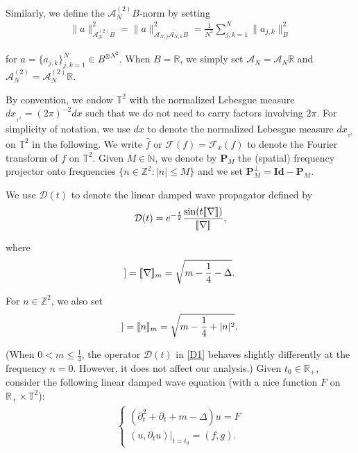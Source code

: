 \documentclass[letterpaper, 11pt,  reqno]{amsart}
\newcommand{\1}{\hspace{0.5mm}\text{I}\hspace{0.2mm}}
\newcommand{\noi}{\noindent}
\newcommand{\R}{\mathbb{R}}
\newcommand{\T}{\mathbb{T}}
\newcommand{\Z}{\mathbb{Z}}
\newcommand{\N}{\mathbb{N}}
\newcommand{\D}{\mathcal{D}}
\newcommand{\Id}{\textbf{Id}}
\newcommand{\Dl}{\Delta}
\newcommand{\dt}{\partial_t}
\newcommand{\nb}{\nabla}
\newcommand{\ft}{\widehat}
\renewcommand{\P}{\mathbf{P}}
\newcommand{\A}{\mathcal{A}}
\newcommand{\F}{\mathcal{F}}
\newcommand{\jbb}[1]{[\hspace{-0.6mm}[ #1 ]\hspace{-0.6mm}]}
\numberwithin{equation}{section}
\numberwithin{theorem}{section}
\begin{document}
\noi
Similarly, 
we define the $\A_N^{(2)} B$-norm by 
setting
\begin{align}
\|  a \|_{\A_N^{(2)} B}^2 
= \|  a \|_{\A_{N, j} \A_{N, k}  B}^2 
=  \frac{1}{N^2} \sum_{j, k = 1}^N \| a_{j, k} \|_B^2
\label{AN2} 
\end{align} 


\noi
for $ a = \{ a_{j, k} \}_{j, k = 1}^N \in B^{\otimes N^2}$. 
When $B = \R$, we simply set
$\A_N = \A_N \R$ and $\A_N^{(2)} = \A_N^{(2)}\R$.




By convention, we endow
$\T^2$ with the normalized Lebesgue measure $ dx_{_{\T^2}} =  (2\pi)^{-2}dx$
such that we do not need to carry factors involving $2\pi$.
For simplicity of notation, 
 we use $dx$ to denote
 the normalized Lebesgue measure  $ dx_{_{\T^2}}$ on $\T^2$
in the following.
 We write $\ft f$ or $\F(f) = \F_x (f)$ to denote the Fourier transform of $f$ on $\T^2$.
Given $M \in \N$, we denote by $\P_M$ the 
(spatial) frequency projector  onto frequencies $\{ n \in \Z^2 : |n| \leq M \}$ and 
we set
$\P_{M}^\perp = \Id - \P_M$.





We use 
 $\D (t)$ 
 to denote 
 the linear damped wave propagator
defined by 
\begin{align}
\D (t) = e^{- \frac{t}{2}} \frac{\sin ( t \jbb{\nb} )}{\jbb{\nb}}, 
\label{D1}
\end{align} 

\noi
where
\begin{align*}
  \jbb{\nb}  
=  \jbb{\nb}_m
  = \sqrt{m - \frac 14 - \Dl}.
\end{align*}

\noi
For $n \in \Z^2$, we also set
\begin{align*}
\jbb{n} 
= \jbb{n}_m= 
 \sqrt{m - \frac 14 + |n|^2}.
\end{align*}


\noi
(When  $0 < m \le \frac 14$, 
the operator $\D(t)$ in \eqref{D1} behaves slightly differently at the frequency $n = 0$.
However, it does not affect our analysis.)
Given $t_0 \in \R_+$, 
consider the following linear damped wave equation
(with a nice function $F$ on $\R_+\times \T^2$):
\begin{align}
\begin{cases}
(\dt^2 + \dt + m - \Dl) u = F\\
(u, \dt u)|_{t = t_0} = (f, g).
\end{cases}
\label{NLWx1}
\end{align}
\end{document}
